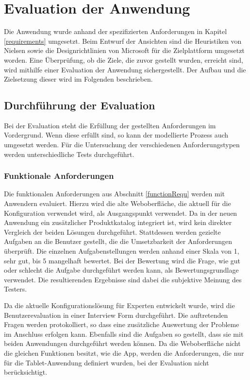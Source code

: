 \chapter{Evaluation der Anwendung}\label{chapter_6}
Die Anwendung wurde anhand der spezifizierten Anforderungen in Kapitel \ref{requirements} umgesetzt. Beim Entwurf der Ansichten sind die Heuristiken von Nielsen \cite{bib:heuristicsNielsen} sowie die Designrichtlinien von Microsoft für die Zielplattform umgesetzt worden. Eine Überprüfung, ob die Ziele, die zuvor gestellt wurden, erreicht sind, wird mithilfe einer Evaluation der Anwendung sichergestellt. Der Aufbau und die Zielsetzung dieser wird im Folgenden beschrieben. 

\section{Durchführung der Evaluation}
 Bei der Evaluation steht die Erfüllung der gestellten Anforderungen im Vordergrund. Wenn diese erfüllt sind, so kann der modellierte Prozess auch umgesetzt werden. Für die Untersuchung der verschiedenen Anforderungstypen werden unterschiedliche Tests durchgeführt.

\subsection{Funktionale Anforderungen}
Die funktionalen Anforderungen aus Abschnitt \ref{functionRequ} werden mit Anwendern evaluiert. Hierzu wird die alte Weboberfläche, die aktuell für die Konfiguration verwendet wird, als Ausgangspunkt verwendet. Da in der neuen Anwendung ein zusätzlicher Produktkatalog integriert ist, wird kein direkter Vergleich der beiden Lösungen durchgeführt. Stattdessen werden gezielte Aufgaben an die Benutzer gestellt, die die Umsetzbarkeit der Anforderungen überprüft. Die einzelnen Aufgabenstellungen werden anhand einer Skala von 1, sehr gut, bis 5 mangelhaft bewertet. Bei der Bewertung wird die Frage, wie gut oder schlecht die Aufgabe durchgeführt werden kann, als  Bewertungsgrundlage verwendet. Die resultierenden Ergebnisse sind dabei die subjektive Meinung des Testers.

Da die aktuelle Konfigurationslösung für Experten entwickelt wurde, wird die Benutzerevaluation in einer Interview Form durchgeführt. Die auftretenden Fragen werden protokolliert, so dass eine zusätzliche Auswertung der Probleme im Anschluss erfolgen kann. Ebenfalls sind die Aufgaben so gestellt, dass sie mit beiden Anwendungen durchgeführt werden können. Da die Weboberfläche nicht die gleichen Funktionen besitzt, wie die App, werden die Anforderungen, die nur für die Tablet-Anwendung definiert wurden, bei der Evaluation nicht berücksichtigt. 

